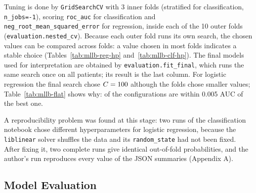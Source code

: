 Tuning is done by \texttt{GridSearchCV} with 3 inner folds (stratified for classification,
\texttt{n\_jobs=-1}), scoring \texttt{roc\_auc} for classification and
\texttt{neg\_\allowbreak{}root\_\allowbreak{}mean\_\allowbreak{}squared\_\allowbreak{}error} for regression, inside each of the 10 outer folds
(\texttt{evaluation.\allowbreak{}nested\_\allowbreak{}cv}). Because each outer fold runs its own search, the chosen values can
be compared across folds: a value chosen in most folds indicates a stable choice
(Tables~\ref{tab:mllb-reg-hp} and~\ref{tab:mllb-clf-hp}). The final models used for interpretation are
obtained by \texttt{evaluation.\allowbreak{}fit\_\allowbreak{}final}, which runs the same search once on all patients; its result
is the last column. For logistic regression the final search chose $C=100$ although the folds
chose smaller values; Table~\ref{tab:mllb-flat} shows why: \LRFlatWithin{} of the \LRFlatTotal{}
configurations are within 0.005 AUC of the best one.

\begin{table}[H]
\centering
\caption{Regression: hyperparameters chosen in the 10 outer folds (count in brackets) and in the final
model.}
\label{tab:mllb-reg-hp}
\resizebox{\textwidth}{!}{}
\end{table}

\begin{table}[H]
\centering
\caption{Classification: hyperparameters chosen in the 10 outer folds and in the final model.}
\label{tab:mllb-clf-hp}
\resizebox{\textwidth}{!}{}
\end{table}

\begin{table}[H]
\centering
\caption{Flatness of the inner-CV surface of the final classification searches.}
\label{tab:mllb-flat}
\resizebox{\textwidth}{!}{}
\end{table}

A reproducibility problem was found at this stage: two runs of the classification notebook chose
different hyperparameters for logistic regression, because the \texttt{liblinear} solver shuffles the
data and its \texttt{random\_state} had not been fixed. After fixing it, two complete runs give
identical out-of-fold probabilities, and the author's run reproduces every value of the JSON summaries
(Appendix A).

\subsection{Model Evaluation}

